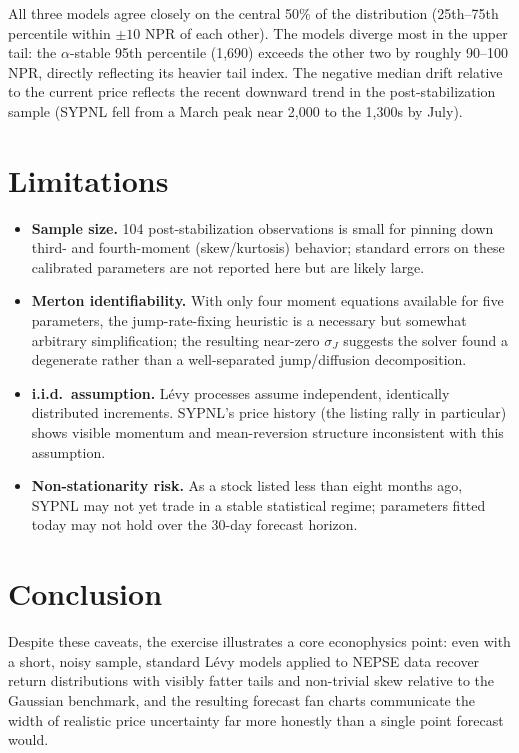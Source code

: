 \documentclass[11pt]{article}
\begin{document}
All three models agree closely on the central 50\% of the distribution (25th--75th percentile within $\pm10$ NPR of each other). The models diverge most in the upper tail: the $\alpha$-stable 95th percentile (1{,}690) exceeds the other two by roughly 90--100 NPR, directly reflecting its heavier tail index. The negative median drift relative to the current price reflects the recent downward trend in the post-stabilization sample (SYPNL fell from a March peak near 2{,}000 to the 1{,}300s by July).

\section{Limitations}
\begin{itemize}
\item \textbf{Sample size.} 104 post-stabilization observations is small for pinning down third- and fourth-moment (skew/kurtosis) behavior; standard errors on these calibrated parameters are not reported here but are likely large.
\item \textbf{Merton identifiability.} With only four moment equations available for five parameters, the jump-rate-fixing heuristic is a necessary but somewhat arbitrary simplification; the resulting near-zero $\sigma_J$ suggests the solver found a degenerate rather than a well-separated jump/diffusion decomposition.
\item \textbf{i.i.d.\ assumption.} Lévy processes assume independent, identically distributed increments. SYPNL's price history (the listing rally in particular) shows visible momentum and mean-reversion structure inconsistent with this assumption.
\item \textbf{Non-stationarity risk.} As a stock listed less than eight months ago, SYPNL may not yet trade in a stable statistical regime; parameters fitted today may not hold over the 30-day forecast horizon.
\end{itemize}

\section{Conclusion}
Despite these caveats, the exercise illustrates a core econophysics point: even with a short, noisy sample, standard Lévy models applied to NEPSE data recover return distributions with visibly fatter tails and non-trivial skew relative to the Gaussian benchmark, and the resulting forecast fan charts communicate the width of realistic price uncertainty far more honestly than a single point forecast would.
\end{document}

